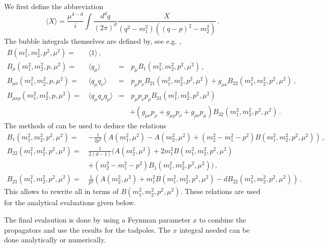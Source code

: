 \documentclass[12pt,a4paper]{article}
\begin{document}
We first define the abbreviation
\begin{equation}
\label{defB}
\langle X \rangle = \frac{\mu^{4-d}}{i}\int \frac{d^d q}{(2\pi)^d}
 \frac{X}{\left(q^2-m_1^2\right) \left((q-p)^2-m_2^2\right) }\,.
\end{equation}
The bubble integrals themselves are defined by, see e.g. \cite{Bijnens:2002hp},
\begin{align}
\label{defbubble}
B(m_1^2,m_2^2,p^2,\mu^2) =\, &
\langle 1 \rangle\,, &&
\nonumber\\
B_\mu(m_1^2,m_2^2,p,\mu^2) =\, &
\langle q_\mu \rangle
& = &\,p_\mu B_1(m_1^2,m_2^2,p^2,\mu^2)\,,
\nonumber\\
B_{\mu\nu}(m_1^2,m_2^2,p,\mu^2) =\, &
\langle q_\mu q_\nu\rangle
&=&\, p_\mu p_\nu B_{21}(m_1^2,m_2^2,p^2,\mu^2)
+g_{\mu\nu} B_{22}(m_1^2,m_2^2,p^2,\mu^2)\,,
\nonumber\\
B_{\mu\nu\rho}(m_1^2,m_2^2,p,\mu^2) =\, &
\langle q_\mu q_\nu q_\rho\rangle
&=&\, p_\mu p_\nu p_\rho B_{31}(m_1^2,m_2^2,p^2,\mu^2)
\nonumber\\
& & &+\left(g_{\mu\nu}p_\rho+g_{\mu\rho}p_\nu+g_{\rho\nu}p_\mu\right) B_{32}(m_1^2,m_2^2,p^2,\mu^2)\,.
\end{align}
The methods of \cite{Passarino:1978jh}
can be used to deduce the relations
\begin{align}
B_1(m_1^2,m_2^2,p^2,\mu^2) =\, &-\frac{1}{2p^2}\left(
  A(m_1^2,\mu^2)-A(m_2^2,\mu^2)+(m_2^2-m_1^2-p^2) B(m_1^2,m_2^2,p^2,\mu^2)
\right)\,,
\nonumber\\
B_{22}(m_1^2,m_2^2,p^2,\mu^2) =\, & \frac{1}{2(d-1)}\Big(
 A(m_2^2,\mu^2)+2 m_1^2 B(m_1^2,m_2^2,p^2,\mu^2)
\nonumber\\&
+(m_2^2-m_1^2-p^2) B_1(m_1^2,m_2^2,p^2,\mu^2)
\Big)\,,
\nonumber\\
B_{21}(m_1^2,m_2^2,p^2,\mu^2) =\, &\frac{1}{p^2}\left(
  A(m_2^2,\mu^2)+m_1^2 B(m_1^2,m_2^2,p^2,\mu^2)-d B_{22}(m_1^2,m_2^2,p^2,\mu^2)
\right)\,.
\end{align}
This allows to rewrite all in terms of $B(m_1^2,m_2^2,p^2,\mu^2)$.
These relations are used for the analytical evaluations given below.

The final evalaution is done by using a Feynman parameter $x$ to
combine the propagators and use the results for the tadpoles.
The $x$ integral needed can be done analytically or numerically.
\end{document}
